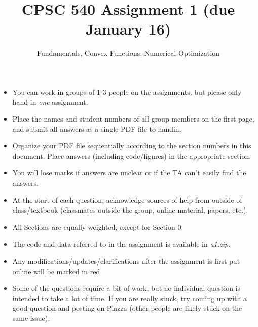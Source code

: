 \documentclass{article}
\begin{document}
\def\blu#1{{\color{blu}#1}}
\def\gre#1{{\color{gre}#1}}
\def\red#1{{\color{red}#1}}
\def\norm#1{\|#1\|}
\newcommand{\argmin}[1]{\mathop{\hbox{argmin}}_{#1}}
\newcommand{\argmax}[1]{\mathop{\hbox{argmax}}_{#1}}
\def\R{\mathbb{R}}
\newcommand{\fig}[2]{\texttt{[image: \#2]}}
\newcommand{\centerfig}[2]{\begin{center}\texttt{[image: \#2]}\end{center}}
\def\items#1{\begin{itemize}#1\end{itemize}}
\def\enum#1{\begin{enumerate}#1\end{enumerate}}
\def\answer#1{\iftoggle{answers}{\blu{Answer}:\\#1}}
\def\argmax{\mathop{\rm arg\,max}}
\def\argmin{\mathop{\rm arg\,min}}
\def\half{\frac 1 2}
\newcommand{\code}[1]{}



\title{CPSC 540 Assignment 1 (due January 16)}
\author{Fundamentals, Convex Functions, Numerical Optimization}
\date{}
\maketitle

\begin{itemize}
\item You can work in groups of 1-3 people on the assignments, but please only hand in \emph{one} assignment.
\item Place the names and student numbers of all group members on the first page, and \blu{submit all answers as a single PDF file to handin}. 
\item Organize your PDF file sequentially according to the section numbers in this document. Place answers (including code/figures) in the appropriate section.
\item You will lose marks if answers are unclear or if the TA can't easily find the answers.
\item At the start of each question, acknowledge sources of help from outside of class/textbook (classmates outside the group, online material, papers, etc.).
\item All Sections are equally weighted, except for Section 0.
\item The code and data referred to in the assignment is available in \emph{a1.zip}.
\item Any modifications/updates/clarifications after the assignment is first put online will be marked in \red{red}.
\item Some of the questions require a bit of work, but no individual question is intended to take a lot of time. If you are really stuck, try coming up with a good question and posting on Piazza (other people are likely stuck on the same issue).
\end{itemize}
\end{document}
